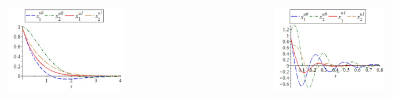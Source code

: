 \documentclass[default]{beamer}
\begin{document}
\begin{frame}
		\begin{columns}
			\begin{column}{0.5\textwidth}
				\begin{figure}
					\includegraphics[width=0.7\textwidth]{control_res_2.jpg}
				\end{figure}
			\end{column}
			\begin{column}{0.5\textwidth}
				\begin{figure}
					\includegraphics[width=0.7\textwidth]{control_res_3.jpg}
				\end{figure}
			\end{column}
		\end{columns}
	\end{frame}
\end{document}
